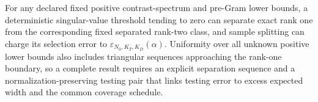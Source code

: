 For any declared fixed positive contrast-spectrum and pre-Gram lower bounds, a deterministic singular-value threshold tending to zero can separate exact rank one from the corresponding fixed separated rank-two class, and sample splitting can charge its selection error to \(\varepsilon_{N_0,K_T,K_D}(\alpha)\). Uniformity over all unknown positive lower bounds also includes triangular sequences approaching the rank-one boundary, so a complete result requires an explicit separation sequence and a normalization-preserving testing pair that links testing error to excess expected width and the common coverage schedule.